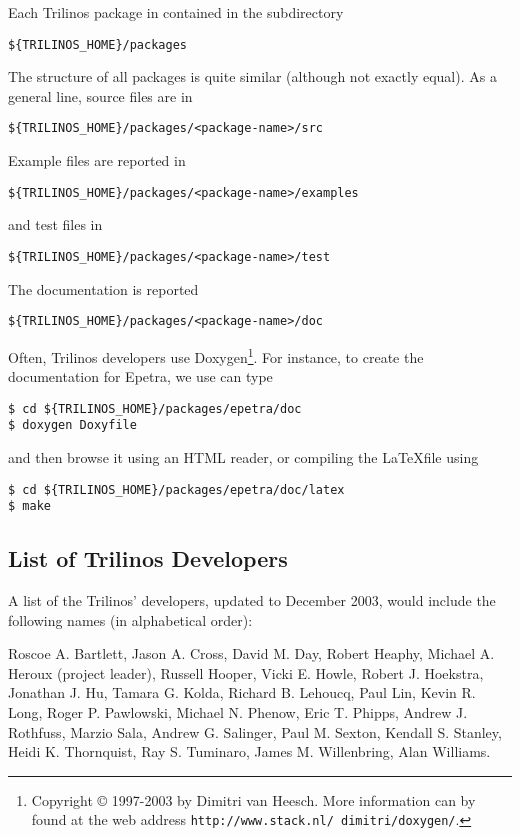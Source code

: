 Each Trilinos package in contained in the subdirectory
\begin{verbatim}
${TRILINOS_HOME}/packages
\end{verbatim}
The structure of all packages is quite similar (although not exactly
equal). As a general line, source files are in
\begin{verbatim}
${TRILINOS_HOME}/packages/<package-name>/src
\end{verbatim}
Example files are reported in \begin{verbatim}
${TRILINOS_HOME}/packages/<package-name>/examples
\end{verbatim}
and test files in
\begin{verbatim}
${TRILINOS_HOME}/packages/<package-name>/test
\end{verbatim}
The documentation is reported
\begin{verbatim}
${TRILINOS_HOME}/packages/<package-name>/doc
\end{verbatim}
Often, Trilinos developers use Doxygen\footnote{Copyright \copyright
  1997-2003 by Dimitri van Heesch. More information can by found at the
  web address {\tt http://www.stack.nl/~dimitri/doxygen/}.}. For
instance, to create the documentation for Epetra, we use can type
\begin{verbatim}
$ cd ${TRILINOS_HOME}/packages/epetra/doc
$ doxygen Doxyfile
\end{verbatim}
and then browse it using an HTML reader, or compiling the \LaTeX file
using
\begin{verbatim}
$ cd ${TRILINOS_HOME}/packages/epetra/doc/latex
$ make
\end{verbatim}


\subsection{List of Trilinos Developers}
\label{sec:intro_incomplete}

A list of the Trilinos' developers, updated to December 2003, would
include the following names (in alphabetical order):

Roscoe A. Bartlett,
Jason A. Cross,
David M. Day,
Robert Heaphy,
Michael A. Heroux (project leader),
Russell Hooper,
Vicki E. Howle,
Robert J. Hoekstra,
Jonathan J. Hu,
Tamara G. Kolda,
Richard B. Lehoucq,
Paul Lin,
Kevin R. Long,
Roger P. Pawlowski,
Michael N. Phenow,
Eric T. Phipps,
Andrew J. Rothfuss,
Marzio Sala,
Andrew G. Salinger,
Paul M. Sexton,
Kendall S. Stanley,
Heidi K. Thornquist,
Ray S. Tuminaro,
James M. Willenbring,
Alan Williams.


